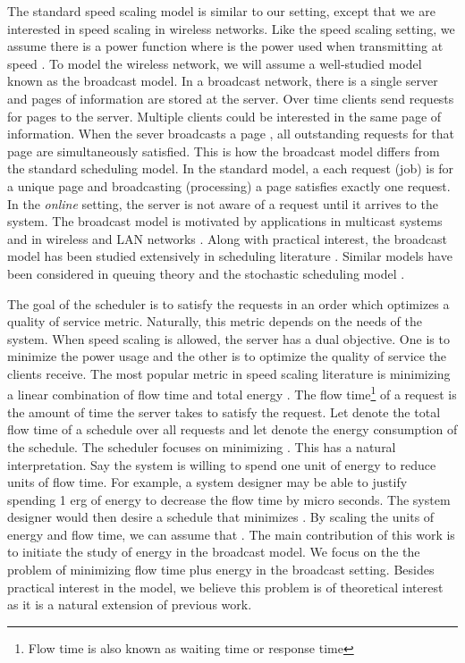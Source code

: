 \documentclass[11pt]{article}
\begin{document}
The standard speed scaling model is similar to our setting, except that we are interested in speed scaling in wireless networks.  Like the speed scaling setting, we assume there  is a power function  where  is the power used when transmitting at speed . To model the wireless network, we will assume a well-studied model known as the broadcast model.  In a broadcast network, there is a single server and  pages of information are stored at the server.  Over time clients send requests for pages to the server.  Multiple clients could be interested in the same page of information.  When the sever broadcasts a page , all outstanding requests for that page are simultaneously satisfied.  This is how the broadcast model differs from the standard scheduling model.  In the standard model, a each request (job) is for a unique page and broadcasting (processing) a page satisfies exactly one request. In the \emph{online} setting, the server is not aware of a request until it arrives to the system.  The broadcast model is motivated by applications in multicast systems and in wireless and LAN networks \cite{Wong88,AcharyaFZ95,AksoyF98,Hall03}.  Along with practical interest, the broadcast model has been studied extensively in scheduling literature \cite{BarnoyBNS98,AksoyF98,AcharyaFZ95,BartalM00,Hall03,GandhiKPS06}.  Similar models have been considered in queuing theory and the stochastic scheduling model \cite{DebS73,Deb84,Weiss79,WeissP81}. 


The goal of the scheduler is to satisfy the requests in an order which optimizes a quality of service metric. Naturally, this metric depends on the needs of the system.  When speed scaling is allowed, the server has a dual objective.   One is to minimize the power usage and the other is to optimize the quality of service the clients receive.  The most popular metric in speed scaling literature is minimizing a  linear combination of flow time and total energy \cite{AlbersF07,BansalPS09,ChanELLMP09,GuptaKP10,BansalCP09}.  The flow time\footnote{Flow time is also known as waiting time or response time} of a request is the amount of time the server takes to satisfy the  request.  Let  denote the total flow time of a schedule over all requests and let  denote the energy consumption of the schedule.  The scheduler focuses on minimizing . This has a natural interpretation.   Say the system is willing to spend one unit of energy to reduce    units of flow time.  For example, a system designer may be able to justify spending 1 erg of energy to decrease the flow time by  micro seconds.  The system designer would then desire a schedule that minimizes .  By scaling the units of energy and flow time, we can assume that .  The main contribution of this work is to initiate the study of energy in the broadcast model. We focus on the the problem of minimizing flow time plus energy in the broadcast setting. Besides practical interest in the model, we believe this problem is of theoretical interest as it is a natural extension of previous work. \\
\end{document}
